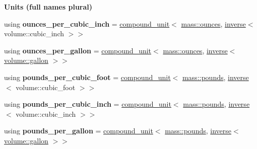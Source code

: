 \begin{Indent}{\bf Units (full names plural)}
\begin{DoxyCompactItemize}
\item 
\hypertarget{namespaceunits_1_1density_ab69d9e8a79462d86ef53e9e77c0a7067}{}using {\bfseries ounces\+\_\+per\+\_\+cubic\+\_\+inch} = \hyperlink{group___unit_types_ga9c3f6f077dc894620e1ed8358442a8f1}{compound\+\_\+unit}$<$ \hyperlink{structunits_1_1unit}{mass\+::ounces}, \hyperlink{group___unit_manipulators_gaacc539ef162e24b260d023d3ff949b57}{inverse}$<$ volume\+::cubic\+\_\+inch $>$$>$\label{namespaceunits_1_1density_ab69d9e8a79462d86ef53e9e77c0a7067}

\item 
\hypertarget{namespaceunits_1_1density_a1bffcb36021305cd3df8bce428207765}{}using {\bfseries ounces\+\_\+per\+\_\+gallon} = \hyperlink{group___unit_types_ga9c3f6f077dc894620e1ed8358442a8f1}{compound\+\_\+unit}$<$ \hyperlink{structunits_1_1unit}{mass\+::ounces}, \hyperlink{group___unit_manipulators_gaacc539ef162e24b260d023d3ff949b57}{inverse}$<$ \hyperlink{structunits_1_1unit}{volume\+::gallon} $>$$>$\label{namespaceunits_1_1density_a1bffcb36021305cd3df8bce428207765}

\item 
\hypertarget{namespaceunits_1_1density_a19ed9e7deb244c6399d66d4c96eea8a1}{}using {\bfseries pounds\+\_\+per\+\_\+cubic\+\_\+foot} = \hyperlink{group___unit_types_ga9c3f6f077dc894620e1ed8358442a8f1}{compound\+\_\+unit}$<$ \hyperlink{structunits_1_1unit}{mass\+::pounds}, \hyperlink{group___unit_manipulators_gaacc539ef162e24b260d023d3ff949b57}{inverse}$<$ volume\+::cubic\+\_\+foot $>$$>$\label{namespaceunits_1_1density_a19ed9e7deb244c6399d66d4c96eea8a1}

\item 
\hypertarget{namespaceunits_1_1density_a29f763fcccb1cd5b949b8cc2ebbba747}{}using {\bfseries pounds\+\_\+per\+\_\+cubic\+\_\+inch} = \hyperlink{group___unit_types_ga9c3f6f077dc894620e1ed8358442a8f1}{compound\+\_\+unit}$<$ \hyperlink{structunits_1_1unit}{mass\+::pounds}, \hyperlink{group___unit_manipulators_gaacc539ef162e24b260d023d3ff949b57}{inverse}$<$ volume\+::cubic\+\_\+inch $>$$>$\label{namespaceunits_1_1density_a29f763fcccb1cd5b949b8cc2ebbba747}

\item 
\hypertarget{namespaceunits_1_1density_abe8551a3c2a563c741949b132840ff15}{}using {\bfseries pounds\+\_\+per\+\_\+gallon} = \hyperlink{group___unit_types_ga9c3f6f077dc894620e1ed8358442a8f1}{compound\+\_\+unit}$<$ \hyperlink{structunits_1_1unit}{mass\+::pounds}, \hyperlink{group___unit_manipulators_gaacc539ef162e24b260d023d3ff949b57}{inverse}$<$ \hyperlink{structunits_1_1unit}{volume\+::gallon} $>$$>$\label{namespaceunits_1_1density_abe8551a3c2a563c741949b132840ff15}


\end{DoxyCompactItemize}
\end{Indent}
